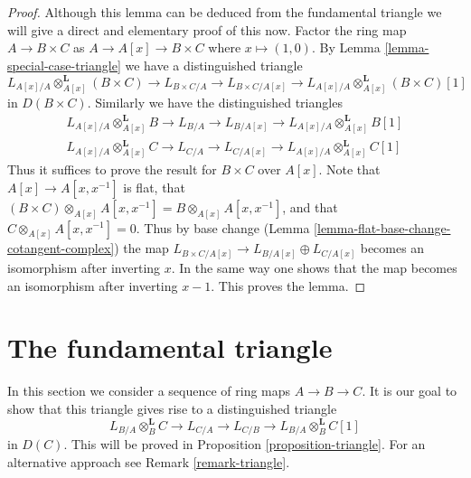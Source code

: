 \documentclass{stacks-project}
\theoremstyle{plain}
\theoremstyle{definition}
\theoremstyle{remark}
\numberwithin{equation}{subsection}
\begin{document}
\begin{proof}
Although this lemma can be deduced from the fundamental triangle
we will give a direct and elementary proof of this now.
Factor the ring map $A \to B \times C$ as $A \to A[x] \to B \times C$
where $x \mapsto (1, 0)$. By Lemma \ref{lemma-special-case-triangle}
we have a distinguished triangle
$$
L_{A[x]/A} \otimes_{A[x]}^\mathbf{L} (B \times C) \to L_{B \times C/A} \to
L_{B \times C/A[x]} \to L_{A[x]/A} \otimes_{A[x]}^\mathbf{L} (B \times C)[1]
$$
in $D(B \times C)$. Similarly we have the distinguished triangles
$$
\begin{matrix}
L_{A[x]/A} \otimes_{A[x]}^\mathbf{L} B \to L_{B/A} \to L_{B/A[x]}
\to L_{A[x]/A} \otimes_{A[x]}^\mathbf{L} B[1] \\
L_{A[x]/A} \otimes_{A[x]}^\mathbf{L} C \to L_{C/A} \to L_{C/A[x]}
\to L_{A[x]/A} \otimes_{A[x]}^\mathbf{L} C[1]
\end{matrix}
$$
Thus it suffices to prove the result for $B \times C$ over $A[x]$.
Note that $A[x] \to A[x, x^{-1}]$ is flat, that
$(B \times C) \otimes_{A[x]} A[x, x^{-1}] = B \otimes_{A[x]} A[x, x^{-1}]$,
and that $C \otimes_{A[x]} A[x, x^{-1}] = 0$.
Thus by base change (Lemma \ref{lemma-flat-base-change-cotangent-complex})
the map $L_{B \times C/A[x]} \to L_{B/A[x]} \oplus L_{C/A[x]}$
becomes an isomorphism after inverting $x$.
In the same way one shows that the map becomes an isomorphism after
inverting $x - 1$. This proves the lemma.
\end{proof}




\section{The fundamental triangle}
\label{section-triangle}

\noindent
In this section we consider a sequence of ring maps $A \to B \to C$.
It is our goal to show that this triangle gives rise to a distinguished
triangle
\begin{equation}
\label{equation-triangle}
L_{B/A} \otimes_B^\mathbf{L} C \to L_{C/A} \to L_{C/B} \to
L_{B/A} \otimes_B^\mathbf{L} C[1]
\end{equation}
in $D(C)$. This will be proved in Proposition \ref{proposition-triangle}.
For an alternative approach see Remark \ref{remark-triangle}.
\end{document}
